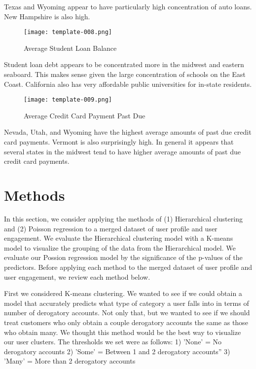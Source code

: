 \documentclass[11pt]{llncs}
\begin{document}
Texas and Wyoming appear to have particularly high concentration of auto loans. New Hampshire is also high. 

\begin{figure}[H]
\begin{center}
\texttt{[image: template-008.png]}
\caption{Average Student Loan Balance}
\end{center}
\end{figure}

Student loan debt appears to be concentrated more in the midwest and eastern seaboard. This makes sense given the large concentration of schools on the East Coast. California also has very affordable public universities for in-state residents.

\begin{figure}[H]
\begin{center}
\texttt{[image: template-009.png]}
\caption{Average Credit Card Payment Past Due}
\end{center}
\end{figure}

Nevada, Utah, and Wyoming have the highest average amounts of past due credit card payments. Vermont is also surprisingly high. In general it appears that several states in the midwest tend to have higher average amounts of past due credit card payments.

\section{Methods}
\label{sec:methods}
In this section, we consider applying the methods of (1) Hierarchical clustering and (2) Poisson regression to a merged dataset of user profile and user engagement. We evaluate the Hierarchical clustering model with a K-means model to visualize the grouping of the data from the Hierarchical model. We evaluate our Possion regression model by the significance of the p-values of the predictors. Before applying each method to the merged dataset of user profile and user engagement, we review each method below.

First we considered K-means clustering. We wanted to see if we could obtain a model that accurately predicts what type of category a user falls into in terms of number of derogatory accounts. Not only that, but we wanted to see if we should treat customers who only obtain a couple derogatory accounts the same as those who obtain many. We thought this method would be the best way to visualize our user clusters. The thresholds we set were as follows: 1) 'None' = No derogatory accounts 2) 'Some' = Between 1 and 2 derogatory accounts” 3) 'Many' = More than 2 derogatory accounts
\end{document}
